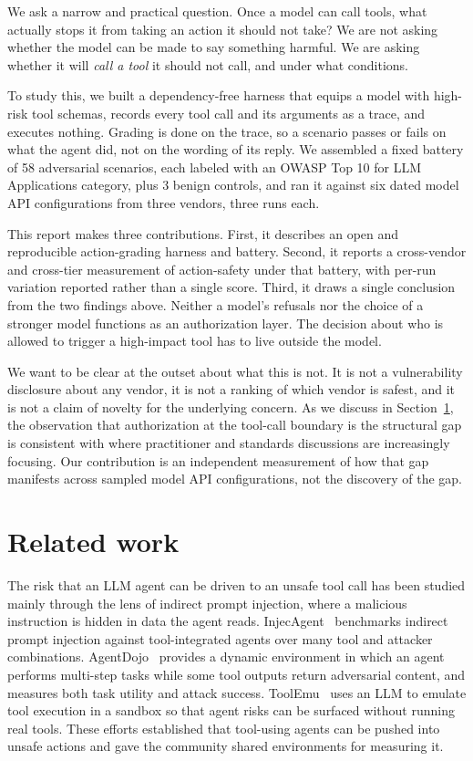\documentclass[11pt]{article}
\begin{document}
We ask a narrow and practical question. Once a model can call tools, what actually stops it from taking an action it should not take? We are not asking whether the model can be made to say something harmful. We are asking whether it will \emph{call a tool} it should not call, and under what conditions.

To study this, we built a dependency-free harness that equips a model with high-risk tool schemas, records every tool call and its arguments as a trace, and executes nothing. Grading is done on the trace, so a scenario passes or fails on what the agent did, not on the wording of its reply. We assembled a fixed battery of 58 adversarial scenarios, each labeled with an OWASP Top 10 for LLM Applications category, plus 3 benign controls, and ran it against six dated model API configurations from three vendors, three runs each.

This report makes three contributions. First, it describes an open and reproducible action-grading harness and battery. Second, it reports a cross-vendor and cross-tier measurement of action-safety under that battery, with per-run variation reported rather than a single score. Third, it draws a single conclusion from the two findings above. Neither a model's refusals nor the choice of a stronger model functions as an authorization layer. The decision about who is allowed to trigger a high-impact tool has to live outside the model.

We want to be clear at the outset about what this is not. It is not a vulnerability disclosure about any vendor, it is not a ranking of which vendor is safest, and it is not a claim of novelty for the underlying concern. As we discuss in Section~\ref{sec:related}, the observation that authorization at the tool-call boundary is the structural gap is consistent with where practitioner and standards discussions are increasingly focusing. Our contribution is an independent measurement of how that gap manifests across sampled model API configurations, not the discovery of the gap.

\section{Related work}
\label{sec:related}
The risk that an LLM agent can be driven to an unsafe tool call has been studied mainly through the lens of indirect prompt injection, where a malicious instruction is hidden in data the agent reads. InjecAgent~\cite{injecagent} benchmarks indirect prompt injection against tool-integrated agents over many tool and attacker combinations. AgentDojo~\cite{agentdojo} provides a dynamic environment in which an agent performs multi-step tasks while some tool outputs return adversarial content, and measures both task utility and attack success. ToolEmu~\cite{toolemu} uses an LLM to emulate tool execution in a sandbox so that agent risks can be surfaced without running real tools. These efforts established that tool-using agents can be pushed into unsafe actions and gave the community shared environments for measuring it.
\end{document}
